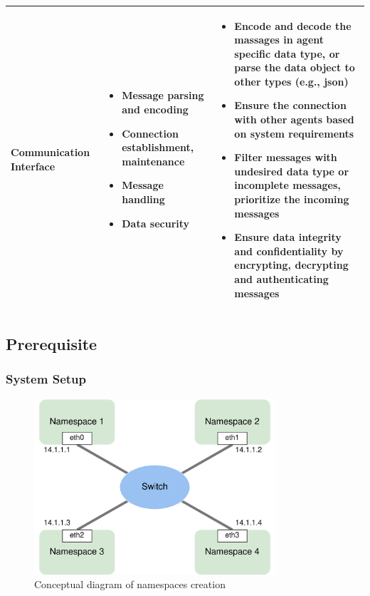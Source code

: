 \begin{table}[p]
\begin{tabularx}{\textwidth}{|Y|Z|W|}
    Communication Interface & 
    \vspace{-15pt}
    \begin{itemize}
        \item Message parsing and encoding
        \item Connection establishment, maintenance
        \item Message handling 
        \item Data security
    \end{itemize}
    & 
    \vspace{-15pt}
    \begin{itemize}
        \item Encode and decode the massages in agent specific data type, or  parse the data object to other types (e.g., json)
        \item Ensure the connection with other agents based on system requirements
        \item Filter messages with undesired data type or incomplete messages, prioritize the incoming messages
        \item Ensure data integrity and confidentiality by encrypting, decrypting and authenticating messages
    \end{itemize} \\
    \hline
    \end{tabularx}
    \end{table}


\subsection{Prerequisite}
\subsubsection{System Setup}
 
\begin{figure}[htbp]
\includegraphics[width=0.8\textwidth]{figures/NamespaceConceptual.png}
\centering
\caption{Conceptual diagram of namespaces creation
\label{fig: NSConceptual}}
\end{figure}

